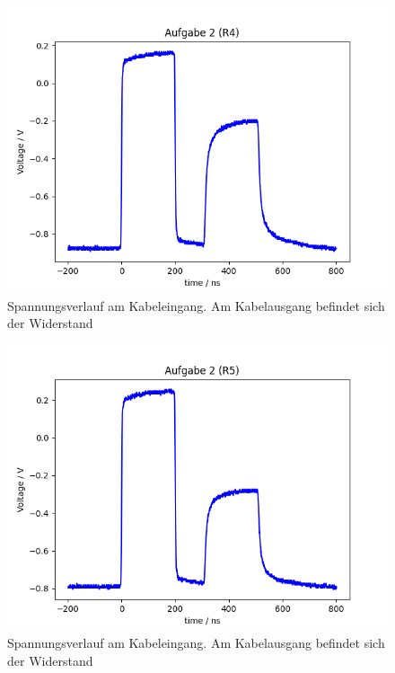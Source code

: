 \documentclass{article}
\begin{document}
\begin{figure}[H]
\centering
\caption{Spannungsverlauf am Kabeleingang. Am Kabelausgang befindet sich der Widerstand }
\label{fig:task2_R4}
\includegraphics[scale=0.6]{bilder/task2/task2_R4.png}
\end{figure}




\begin{figure}[H]
\centering
\caption{Spannungsverlauf am Kabeleingang. Am Kabelausgang befindet sich der Widerstand }
\label{fig:task2_R5}
\includegraphics[scale=0.6]{bilder/task2/task2_R5.png}
\end{figure}
\end{document}
